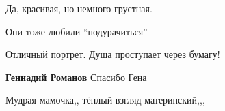  
 
 
 
 

Да, красивая, но немного грустная.

Они тоже любили \enquote{подурачиться}

Отличный портрет. Душа проступает через бумагу!

\textbf{Геннадий Романов} Спасибо Гена

Мудрая мамочка,, тёплый взгляд материнский,,,
